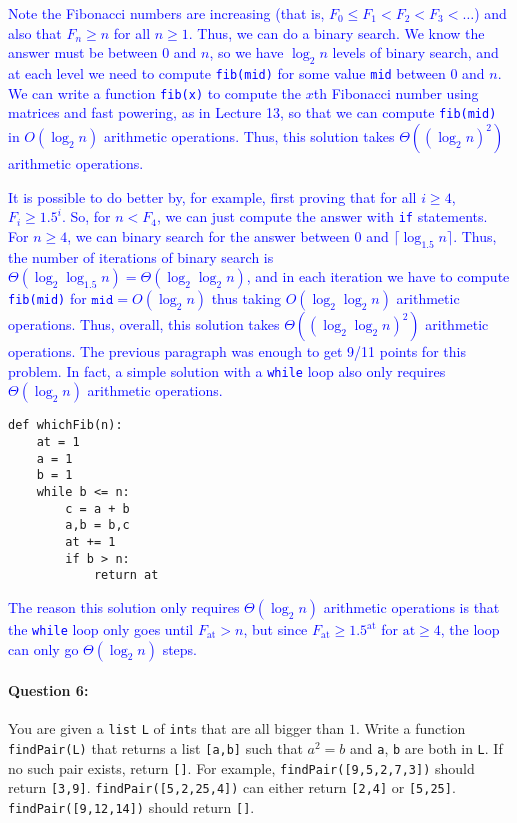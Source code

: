 \documentclass[11pt]{article}
\def\ceil#1{\lceil #1 \rceil}
\newcommand{\sol}[1]{\textcolor{blue}{#1}}
\begin{document}
\sol{Note the Fibonacci numbers are increasing (that is, $F_0 \le F_1
    < F_2 < F_3 < \ldots$) and also that $F_n \ge n$ for all $n\ge
    1$.  Thus, we can do a binary search.  We know the answer must be
    between $0$ and $n$, so we have $\log_2 n$ levels of binary
    search, and at each level we need to compute \texttt{fib(mid)} for
    some value \texttt{mid} between $0$ and $n$.  We can write a
    function \texttt{fib(x)} to compute the $x$th Fibonacci
    number using matrices and fast powering, as in Lecture 13, so that
    we can
    compute \texttt{fib(mid)} in $O(\log_2 n)$ arithmetic operations.
  Thus, this solution takes $\Theta((\log_2 n)^2)$ arithmetic operations.}

\sol{
It is possible to do better by, for example, first proving that for
all $i\ge 4$, $F_i \ge 1.5^i$.  So, for $n < F_4$, we can just compute
the answer with \texttt{if} statements.  For $n \ge 4$, we can binary
search for the answer between $0$ and $\ceil{\log_{1.5} n}$.  Thus, the
number of iterations of binary search is $\Theta(\log_2\log_{1.5} n) =
\Theta(\log_2\log_2 n)$, and in each iteration we have to compute
\texttt{fib(mid)} for $\texttt{mid} = O(\log_2 n)$ thus taking
$O(\log_2\log_2 n)$ arithmetic operations.  Thus, overall, this
solution takes $\Theta((\log_2\log_2 n)^2)$ arithmetic operations.
The previous paragraph was enough to get 9/11 points for this
problem. In fact, a simple solution with a \texttt{while} loop also only
  requires $\Theta(\log_2 n)$ arithmetic operations.}

\begin{verbatim}
def whichFib(n):
    at = 1
    a = 1
    b = 1
    while b <= n:
        c = a + b
        a,b = b,c
        at += 1
        if b > n:
            return at 
\end{verbatim}

\sol{
The reason this solution only requires $\Theta(\log_2 n)$ arithmetic
operations is that
the \texttt{while} loop only goes until $F_{\mathrm{at}} > n$, but
since $F_{\mathrm{at}} \ge 1.5^{\mathrm{at}}$ for $\mathrm{at}\ge 4$,
the loop
can only go $\Theta(\log_2 n)$ steps.
}

\newpage

\paragraph{Question 6:}
You are given a \texttt{list} \texttt{L} of \texttt{int}s that are all
bigger than $1$.  Write a function \texttt{findPair(L)} that returns a
list \texttt{[a,b]} such that $a^2 = b$ and \texttt{a}, \texttt{b} are
both in \texttt{L}.  If no such pair exists, return \texttt{[]}.  For
example, \texttt{findPair([9,5,2,7,3])} should return \texttt{[3,9]}.
\texttt{findPair([5,2,25,4])} can either return \texttt{[2,4]} or
\texttt{[5,25]}.  \texttt{findPair([9,12,14])} should return
\texttt{[]}.  
\end{document}
